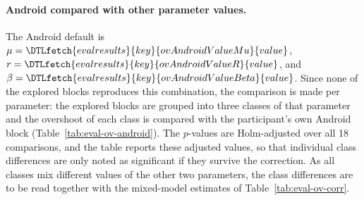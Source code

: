 \documentclass[12pt,a4paper]{report}
\newcommand{\evalval}[1]{\DTLfetch{evalresults}{key}{#1}{value}}
\begin{document}
        \paragraph{Android compared with other parameter values.} The Android default is $\mu=\evalval{ovAndroidValueMu}$, $r=\evalval{ovAndroidValueR}$, and $\beta=\evalval{ovAndroidValueBeta}$. Since none of the explored blocks reproduces this combination, the comparison is made per parameter: the explored blocks are grouped into three classes of that parameter and the overshoot of each class is compared with the participant's own Android block (Table~\ref{tab:eval-ov-android}). The $p$-values are Holm-adjusted over all 18 comparisons, and the table reports these adjusted values, so that individual class differences are only noted as significant if they survive the correction. As all classes mix different values of the other two parameters, the class differences are to be read together with the mixed-model estimates of Table~\ref{tab:eval-ov-corr}.
\end{document}
